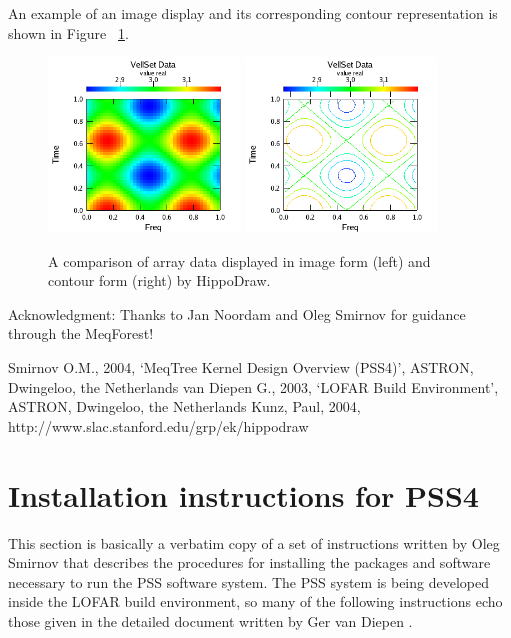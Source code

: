 \documentclass[10pt]{article}
\begin{document}
An example of an image display and its corresponding contour representation is
shown in Figure ~\ref{fig:comparison}.


\begin{figure}
\begin{center}
\includegraphics[width=2in]{Figures/image_display}
\includegraphics[width=2in]{Figures/contour_display}
\end{center}
\caption {A comparison of array data displayed in image form (left) 
and contour form (right) by HippoDraw.}
\label{fig:comparison}
\end{figure}

\vspace{1.0cm}                         
Acknowledgment: Thanks to Jan Noordam and Oleg Smirnov for guidance through 
the MeqForest!

\begin{thebibliography}{}
 Smirnov O.M., 2004, `MeqTree Kernel Design Overview (PSS4)',
ASTRON, Dwingeloo, the Netherlands
 van Diepen G., 2003, `LOFAR Build Environment',
ASTRON, Dwingeloo, the Netherlands
 Kunz, Paul, 2004, http://www.slac.stanford.edu/grp/ek/hippodraw
\end{thebibliography}
 

\section {Installation instructions for PSS4}
This section is basically a verbatim copy of a set of instructions
written by Oleg Smirnov that describes the procedures for installing the 
packages and software necessary to run the PSS software system.
The PSS system is being developed inside the LOFAR build environment,
so many of the following instructions echo those given in the detailed
document written by Ger van Diepen \cite{diepen}.
\end{document}
